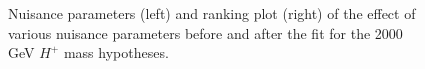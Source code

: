 \begin{figure}[H]
  \centering
  \caption{Nuisance parameters (left) and ranking plot (right) of the effect of various nuisance parameters before and after the fit for the 2000 GeV $H^{+}$ mass hypotheses.}
\end{figure}
